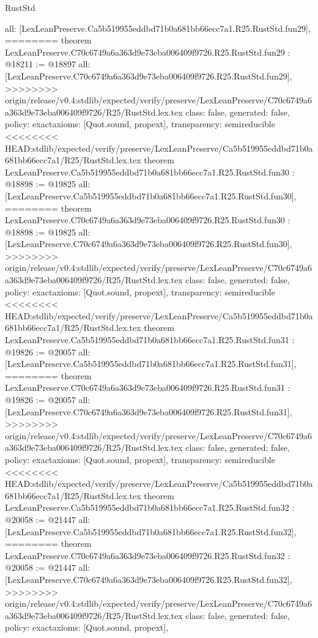 \begin{lexlean}{RustStd}
\begin{coremodule}
{\begin{coremodule}
{{{{{{{{{{{{{{{{{{{{{{{{{{{{{{{{  all: [LexLeanPreserve.Ca5b519955eddbd71b0a681bb66ecc7a1.R25.RustStd.fun29],
========
theorem LexLeanPreserve.C70c6749a6a363d9e73eba006409f9726.R25.RustStd.fun29 : @18211 := @18897 {
  all: [LexLeanPreserve.C70c6749a6a363d9e73eba006409f9726.R25.RustStd.fun29],
>>>>>>>> origin/release/v0.4:stdlib/expected/verify/preserve/LexLeanPreserve/C70c6749a6a363d9e73eba006409f9726/R25/RustStd.lex.tex
  class: false,
  generated: false,
  policy: exact{axioms: [Quot.sound, propext]},
  transparency: semireducible
}
<<<<<<<< HEAD:stdlib/expected/verify/preserve/LexLeanPreserve/Ca5b519955eddbd71b0a681bb66ecc7a1/R25/RustStd.lex.tex
theorem LexLeanPreserve.Ca5b519955eddbd71b0a681bb66ecc7a1.R25.RustStd.fun30 : @18898 := @19825 {
  all: [LexLeanPreserve.Ca5b519955eddbd71b0a681bb66ecc7a1.R25.RustStd.fun30],
========
theorem LexLeanPreserve.C70c6749a6a363d9e73eba006409f9726.R25.RustStd.fun30 : @18898 := @19825 {
  all: [LexLeanPreserve.C70c6749a6a363d9e73eba006409f9726.R25.RustStd.fun30],
>>>>>>>> origin/release/v0.4:stdlib/expected/verify/preserve/LexLeanPreserve/C70c6749a6a363d9e73eba006409f9726/R25/RustStd.lex.tex
  class: false,
  generated: false,
  policy: exact{axioms: [Quot.sound, propext]},
  transparency: semireducible
}
<<<<<<<< HEAD:stdlib/expected/verify/preserve/LexLeanPreserve/Ca5b519955eddbd71b0a681bb66ecc7a1/R25/RustStd.lex.tex
theorem LexLeanPreserve.Ca5b519955eddbd71b0a681bb66ecc7a1.R25.RustStd.fun31 : @19826 := @20057 {
  all: [LexLeanPreserve.Ca5b519955eddbd71b0a681bb66ecc7a1.R25.RustStd.fun31],
========
theorem LexLeanPreserve.C70c6749a6a363d9e73eba006409f9726.R25.RustStd.fun31 : @19826 := @20057 {
  all: [LexLeanPreserve.C70c6749a6a363d9e73eba006409f9726.R25.RustStd.fun31],
>>>>>>>> origin/release/v0.4:stdlib/expected/verify/preserve/LexLeanPreserve/C70c6749a6a363d9e73eba006409f9726/R25/RustStd.lex.tex
  class: false,
  generated: false,
  policy: exact{axioms: [Quot.sound, propext]},
  transparency: semireducible
}
<<<<<<<< HEAD:stdlib/expected/verify/preserve/LexLeanPreserve/Ca5b519955eddbd71b0a681bb66ecc7a1/R25/RustStd.lex.tex
theorem LexLeanPreserve.Ca5b519955eddbd71b0a681bb66ecc7a1.R25.RustStd.fun32 : @20058 := @21447 {
  all: [LexLeanPreserve.Ca5b519955eddbd71b0a681bb66ecc7a1.R25.RustStd.fun32],
========
theorem LexLeanPreserve.C70c6749a6a363d9e73eba006409f9726.R25.RustStd.fun32 : @20058 := @21447 {
  all: [LexLeanPreserve.C70c6749a6a363d9e73eba006409f9726.R25.RustStd.fun32],
>>>>>>>> origin/release/v0.4:stdlib/expected/verify/preserve/LexLeanPreserve/C70c6749a6a363d9e73eba006409f9726/R25/RustStd.lex.tex
  class: false,
  generated: false,
  policy: exact{axioms: [Quot.sound, propext]},
}}}}}}}}}}}}}}}}}}}}}}}}}}}}}}}}}}}}
\end{coremodule}}
\end{coremodule}
\end{lexlean}
